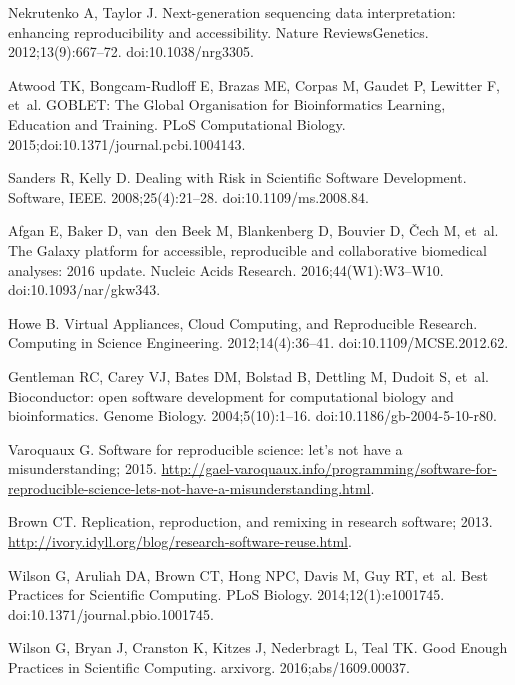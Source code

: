 \documentclass[10pt,letterpaper]{article}
\begin{document}
\begin{thebibliography}{10}
Nekrutenko A, Taylor J.
\newblock Next-generation sequencing data interpretation: enhancing
  reproducibility and accessibility.
\newblock Nature ReviewsGenetics. 2012;13(9):667--72.
\newblock doi:{10.1038/nrg3305}.

Atwood TK, Bongcam-Rudloff E, Brazas ME, Corpas M, Gaudet P, Lewitter F, et~al.
\newblock GOBLET: The Global Organisation for Bioinformatics Learning,
  Education and Training.
\newblock PLoS Computational Biology. 2015;doi:{10.1371/journal.pcbi.1004143}.

Sanders R, Kelly D.
\newblock Dealing with Risk in Scientific Software Development.
\newblock Software, IEEE. 2008;25(4):21--28.
\newblock doi:{10.1109/ms.2008.84}.

Afgan E, Baker D, van~den Beek M, Blankenberg D, Bouvier D, Čech M, et~al.
\newblock The Galaxy platform for accessible, reproducible and collaborative
  biomedical analyses: 2016 update.
\newblock Nucleic Acids Research. 2016;44(W1):W3--W10.
\newblock doi:{10.1093/nar/gkw343}.

Howe B.
\newblock Virtual Appliances, Cloud Computing, and Reproducible Research.
\newblock Computing in Science Engineering. 2012;14(4):36--41.
\newblock doi:{10.1109/MCSE.2012.62}.

Gentleman RC, Carey VJ, Bates DM, Bolstad B, Dettling M, Dudoit S, et~al.
\newblock Bioconductor: open software development for computational biology and
  bioinformatics.
\newblock Genome Biology. 2004;5(10):1--16.
\newblock doi:{10.1186/gb-2004-5-10-r80}.

Varoquaux G. Software for reproducible science: let’s not have a
  misunderstanding; 2015.
\newblock
  \url{http://gael-varoquaux.info/programming/software-for-reproducible-science-lets-not-have-a-misunderstanding.html}.

Brown CT. Replication, reproduction, and remixing in research software; 2013.
\newblock \url{http://ivory.idyll.org/blog/research-software-reuse.html}.

Wilson G, Aruliah DA, Brown CT, Hong NPC, Davis M, Guy RT, et~al.
\newblock Best Practices for Scientific Computing.
\newblock PLoS Biology. 2014;12(1):e1001745.
\newblock doi:{10.1371/journal.pbio.1001745}.

Wilson G, Bryan J, Cranston K, Kitzes J, Nederbragt L, Teal TK.
\newblock Good Enough Practices in Scientific Computing.
\newblock arxivorg. 2016;abs/1609.00037.


\end{thebibliography}
\end{document}
